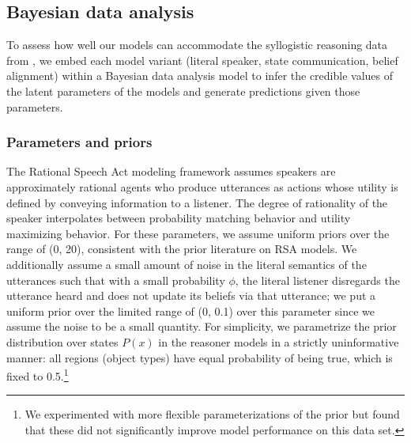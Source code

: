 \documentclass[floatsintext, doc]{apa6}
\begin{document}
\subsection{Bayesian data analysis}

To assess how well our models can accommodate the syllogistic reasoning data from , we embed each model variant (literal speaker, state communication, belief alignment) within a Bayesian data analysis model to infer the credible values of the latent parameters of the models and generate predictions given those parameters. 

\subsubsection{Parameters and priors}

The Rational Speech Act modeling framework assumes speakers are approximately rational agents who produce utterances as actions whose utility is defined by conveying information to a listener. The degree of rationality of the speaker interpolates between probability matching behavior and utility maximizing behavior. 
For these parameters, we assume uniform priors over the range of (0, 20), consistent with the prior literature on RSA models. 
We additionally assume a small amount of noise in the literal semantics of the utterances such that with a small probability $\phi$, the literal listener disregards the utterance heard and does not update its beliefs via that utterance; we put a uniform prior over the limited range of (0, 0.1) over this parameter since we assume the noise to be a small quantity. 
For simplicity, we parametrize the prior distribution over states $P(x)$ in the reasoner models in a strictly uninformative manner: all regions (object types) have equal probability of being true, which is fixed to 0.5.\footnote{
We experimented with more flexible parameterizations of the prior but found that these did not significantly improve model performance on this data set.}

\end{document}
